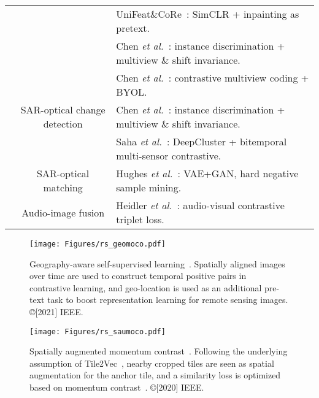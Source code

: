 \documentclass[lettersize,journal]{IEEEtran}
\newcommand{\etal}{\textit{et al.}}
\begin{document}
\begin{table*}
{\begin{tabular}{|c|c|l|}
                                 &                                               & UniFeat\&CoRe~\cite{montanaro2021self}: SimCLR + inpainting as pretext.                         \\
                                 &                                               & Chen \etal~\cite{chen2021self0}: instance discrimination + multiview \& shift invariance.       \\ \cline{2-3} 
                                 & \multirow{3}{*}{SAR-optical change detection} & Chen \etal~\cite{chen2021self1}: contrastive multiview coding + BYOL.                           \\
                                 &                                               & Chen \etal~\cite{chen2021self2}: instance discrimination + multiview \& shift invariance.       \\
                                 &                                               & Saha \etal~\cite{saha2021self}: DeepCluster + bitemporal multi-sensor contrastive.              \\ \cline{2-3} 
                                 & SAR-optical matching                          & Hughes \etal~\cite{hughes2018mining}: VAE+GAN, hard negative sample mining.                     \\ \cline{2-3} 
                                 & Audio-image fusion                            & Heidler \etal~\cite{heidler2021self}: audio-visual contrastive triplet loss.                    \\ \hline
\end{tabular}

}
\end{table*}





\begin{figure}
\centering
\texttt{[image: Figures/rs\_geomoco.pdf]}
\caption[geomoco]{Geography-aware self-supervised learning~\cite{ayush2020geography}. Spatially aligned images over time are used to construct temporal positive pairs in contrastive learning, and geo-location is used as an additional pre-text task to boost representation learning for remote sensing images. ©[2021] IEEE.}
\label{fig:geomoco}
\end{figure}



\begin{figure*}
\centering
\texttt{[image: Figures/rs\_saumoco.pdf]}
\caption[saumoco]{Spatially augmented momentum contrast~\cite{kang2020deep}. Following the underlying assumption of Tile2Vec~\cite{jean2019tile2vec}, nearby cropped tiles are seen as spatial augmentation for the anchor tile, and a similarity loss is optimized based on momentum contrast~\cite{he2020momentum}. ©[2020] IEEE.}
\label{fig:saumoco}
\end{figure*}
\end{document}
